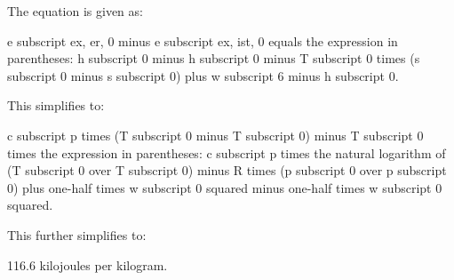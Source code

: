 The equation is given as:

e subscript ex, er, 0 minus e subscript ex, ist, 0 equals the expression in parentheses: h subscript 0 minus h subscript 0 minus T subscript 0 times (s subscript 0 minus s subscript 0) plus w subscript 6 minus h subscript 0.

This simplifies to:

c subscript p times (T subscript 0 minus T subscript 0) minus T subscript 0 times the expression in parentheses: c subscript p times the natural logarithm of (T subscript 0 over T subscript 0) minus R times (p subscript 0 over p subscript 0) plus one-half times w subscript 0 squared minus one-half times w subscript 0 squared.

This further simplifies to:

116.6 kilojoules per kilogram.